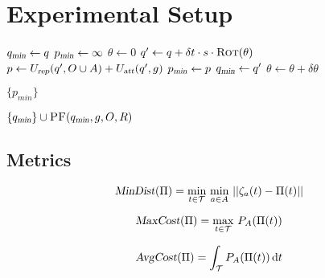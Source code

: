 


\chapter{Experimental Setup}

\label{chapter:experimentalsetup}

\begin{algorithm}[ht]

    \caption{$\Function{PF}(q, g, O, A, R)$}

    \label{algo:pf}
    \begin{algorithmic}[1]
        \setcounter{ALC@line}{0}
        \vspace*{1mm}

        \STATE $q_{\Var{min}} \leftarrow q$
        \STATE $p_{\Var{min}} \leftarrow \infty$
        \STATE $\theta \leftarrow 0$
        \WHILE {$\theta \leq 2\pi$}
            \STATE $q' \leftarrow q + \delta t \cdot s \cdot \Function{Rot}(\theta)$
            \STATE $p \leftarrow U_{\Var{rep}}(q', O \cup A) + U_{\Var{att}}(q', g)$
               \STATE $p_{\Var{min}} \leftarrow p$
                \STATE $q_{\Var{min}} \leftarrow q'$
            \ENDIF
            \STATE $\theta \leftarrow \theta + \delta \theta$
        \ENDWHILE

            \RETURN $\{p_{min}\}$
        \ENDIF

        \RETURN $\{q_{\Var{min}}\} \cup \Function{PF}(q_{\Var{min}}, g, O, R)$
    \end{algorithmic}
\end{algorithm}

\section{Metrics}

\begin{equation}
    \Var{MinDist}(\Pi) = \min_{t \in \mathcal{T}} \, \min_{a \in A} \, ||\zeta_a(t) - \Pi(t)||
    \label{eq:md_metric}
\end{equation}

\begin{equation}
    \Var{MaxCost}(\Pi) = \max_{t \in \mathcal{T}} \, P_A(\Pi(t))
    \label{eq:cost_metric}
\end{equation}

\begin{equation}
    \Var{AvgCost}(\Pi) = \int_{\mathcal{T}} P_A(\Pi(t)) \, \mathrm{d}t
    \label{eq:avg_cost_metric}
\end{equation}


